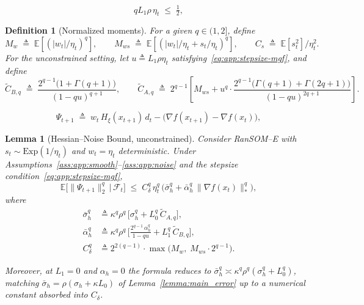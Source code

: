 \documentclass[10pt,a4paper]{amsart}
\newtheorem{lemma}{Lemma}
\newtheorem{definition}{Definition}
\begin{document}
\begin{equation}
  q L_1 \rho\, \eta_t \;\leq\; \tfrac12,
  \label{eq:app:stepsize-mgf}
\end{equation}

\begin{definition}[Normalized moments]
\label{def:app:moments}
For a given $q \in (1, 2]$, define
\begin{equation}
  M_w \;\triangleq\; \mathbb{E}\!\left[(|w_t|/\eta_t)^q\right],
  \qquad
  M_{ws} \;\triangleq\; \mathbb{E}\!\left[(|w_t|/\eta_t + s_t/\eta_t)^q\right],
  \qquad
  C_s \;\triangleq\; \mathbb{E}[s_t^2]/\eta_t^2.
  \label{eq:app:moments}
\end{equation}
For the unconstrained setting, let $u \triangleq L_1 \rho \eta_t$
satisfying~\eqref{eq:app:stepsize-mgf}, and define
\begin{equation}
  \widetilde C_{B,q} \;\triangleq\;
    \frac{2^{q-1}\bigl(1 + \Gamma(q+1)\bigr)}{(1 - qu)^{q+1}},
  \qquad
  \widetilde C_{A,q} \;\triangleq\;
    2^{q-1}\!\left[M_{ws} +
      u^q\cdot\frac{2^{q-1}\bigl(\Gamma(q+1) + \Gamma(2q+1)\bigr)}
        {(1 - qu)^{2q+1}}\right].
  \label{eq:app:CAB}
\end{equation}
\end{definition}

\begin{equation}
  \Psi_{t+1}
  \;\triangleq\;
  w_t\, H_\xi(x_{t+1})\, d_t
    - \bigl(\nabla f(x_{t+1}) - \nabla f(x_t)\bigr),
  \label{eq:app:Psi-def}
\end{equation}

\begin{lemma}[Hessian--Noise Bound, unconstrained]
\label{lem:app:hess-noise}
Consider RanSOM--E with $s_t \sim \mathrm{Exp}(1/\eta_t)$ and $w_t =
\eta_t$ deterministic. Under
Assumptions~\ref{ass:app:smooth}--\ref{ass:app:noise} and the stepsize
condition~\eqref{eq:app:stepsize-mgf},
\begin{equation}
  \mathbb{E}\bigl[\|\Psi_{t+1}\|_2^q \,\big|\, \mathcal{F}_t\bigr]
  \;\leq\;
  C_\delta^q\, \eta_t^q\,
    \bigl(\bar\sigma_h^q + \bar\alpha_h^q\, \|\nabla f(x_t)\|_*^q\bigr),
  \label{eq:app:hess-noise}
\end{equation}
where
\begin{align}
  \bar\sigma_h^q
  &\triangleq \kappa^q \rho^q\,\bigl[\sigma_h^q
    + L_0^q\, \widetilde C_{A,q}\bigr],
  \label{eq:app:sigma-bar} \\
  \bar\alpha_h^q
  &\triangleq \kappa^q \rho^q\,\bigl[\tfrac{2^{q-1}\,\alpha_h^q}{1 - qu}
    + L_1^q\, \widetilde C_{B,q}\bigr],
  \label{eq:app:alpha-bar} \\
  C_\delta^q
  &\triangleq 2^{2(q-1)}\cdot \max\bigl(M_w,\; M_{ws}\cdot 2^{q-1}\bigr).
  \label{eq:app:C-delta}
\end{align}

Moreover, at $L_1 = 0$ and $\alpha_h = 0$ the formula reduces to
$\bar\sigma_h^q \asymp \kappa^q\rho^q(\sigma_h^q + L_0^q)$, matching
$\bar\sigma_h = \rho(\sigma_h + \kappa L_0)$ of
Lemma~\ref{lemma:main_error} up to a numerical constant absorbed into
$C_\delta$.
\end{lemma}
\end{document}
